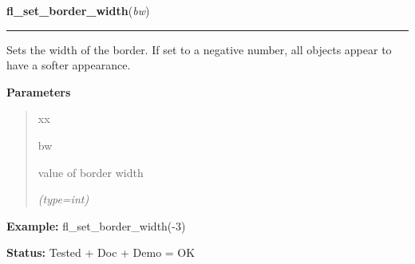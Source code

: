 \hspace{.8\funcindent}\begin{boxedminipage}{\funcwidth}

    \raggedright \textbf{fl\_set\_border\_width}(\textit{bw})

    \vspace{-1.5ex}

    \rule{\textwidth}{0.5\fboxrule}
\setlength{\parskip}{2ex}
    Sets the width of the border.  If set to a negative number, all objects
    appear to have a softer appearance.

\setlength{\parskip}{1ex}
      \textbf{Parameters}
      \vspace{-1ex}

      \begin{quote}
        \begin{Ventry}{xx}

          \item[bw]

          value of border width

            {\it (type=int)}

        \end{Ventry}

      \end{quote}

\textbf{Example:} fl\_set\_border\_width(-3)



\textbf{Status:} Tested + Doc + Demo = OK



    \end{boxedminipage}

    \label{xformslib:flbasic:fl_set_scrollbar_type}

    \vspace{0.5ex}

